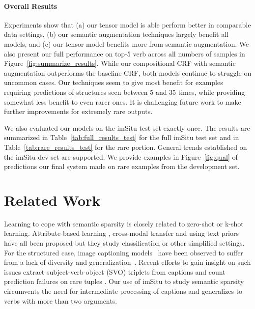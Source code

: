 \documentclass[10pt,twocolumn,letterpaper]{article}
\begin{document}
\paragraph{Overall Results}
Experiments show that (a) our tensor model is able perform better in comparable data settings, (b) our semantic augmentation techniques largely benefit all models, and (c) our tensor model benefits more from semantic augmentation. 
We also present our full performance on top-5 verb across all numbers of samples in Figure~\ref{fig:summarize_results}. 
While our compositional CRF with semantic augmentation outperforms the baseline CRF, both models continue to struggle on uncommon cases. 
Our techniques seem to give most benefit for examples requiring predictions of structures seen between 5 and 35 times, while providing somewhat less benefit to even rarer ones. 
It is challenging future work to make further improvements for extremely rare outputs. 

We also evaluated our models on the imSitu test set exactly once. 
The results are summarized in Table~\ref{tab:full_results_test} for the full imSitu test set and in Table~\ref{tab:rare_results_test} for the rare portion. 
General trends established on the imSitu dev set are supported.
We provide examples in Figure~\ref{fig:qual} of predictions our final system made on rare examples from the development set. 







 \section{Related Work}














Learning to cope with semantic sparsity is closely related to zero-shot or k-shot learning. 
Attribute-based learning \cite{lampert2014attribute,lampert,attributes}, cross-modal transfer \cite{lapata, lei2015predicting, devise, wampimuk} and using text priors \cite{lu2016visual,youtube2txt} have all been proposed but they study classification or other simplified settings. 
For the structured case, image captioning models~\cite{me,stanfordcaption,larrycaption,msrcaption,baidu,hodosh,flikr1m,coco} have been observed to suffer from a lack of diversity and generalization~\cite{googlecaption}.
Recent efforts to gain insight on such issues extract subject-verb-object (SVO) triplets from captions and count prediction failures on rare tuples \cite{atzmon2016learning}. 
Our use of imSitu to study semantic sparsity circumvents the need for intermediate processing of captions and generalizes to verbs with more than two arguments.
\end{document}

